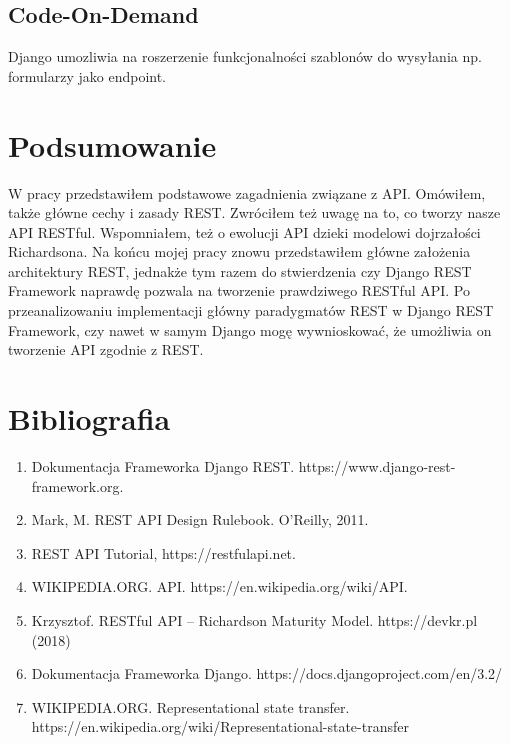 \documentclass[oneside,polski,logo,indent]{amuthesis}
\begin{document}
\begin{enumerate}
\begin{enumerate}
\begin{center}
\subsection{Code-On-Demand}
\end{center}
Django umozliwia na roszerzenie funkcjonalności szablonów do wysyłania np. formularzy jako endpoint.

\section{Podsumowanie}
W pracy przedstawiłem podstawowe zagadnienia związane z API. Omówiłem, także główne cechy i zasady REST. Zwróciłem też uwagę na to, co tworzy nasze API RESTful. Wspomniałem, też o ewolucji API dzieki modelowi dojrzałości Richardsona. Na końcu mojej pracy znowu przedstawiłem główne założenia architektury REST, jednakże tym razem do stwierdzenia czy Django REST Framework naprawdę pozwala na tworzenie prawdziwego RESTful API. Po przeanalizowaniu implementacji główny paradygmatów REST w Django REST Framework, czy nawet w samym Django mogę wywnioskować, że umożliwia on tworzenie API zgodnie z REST.

\section{Bibliografia}
\begin{enumerate}[leftmargin=5pt,rightmargin=5pt]
\item Dokumentacja Frameworka Django REST. https://www.django-rest-framework.org.

\item Mark, M. REST API Design Rulebook. O'Reilly, 2011. 

\item REST API Tutorial, https://restfulapi.net. 

\item WIKIPEDIA.ORG. API. https://en.wikipedia.org/wiki/API. 

\item Krzysztof. RESTful API – Richardson Maturity Model. https://devkr.pl (2018) 

\item Dokumentacja Frameworka Django. https://docs.djangoproject.com/en/3.2/

\item WIKIPEDIA.ORG. Representational state transfer. https://en.wikipedia.org/wiki/Representational-state-transfer


\end{enumerate}
\end{enumerate}
\end{enumerate}
\end{document}
